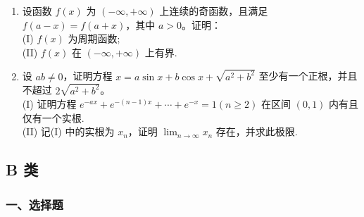 \documentclass[12pt, a4paper]{ctexart}
\begin{document}
\begin{enumerate}[start=52]
    \item 设函数 $ f(x) $ 为 $ (-\infty, +\infty) $ 上连续的奇函数，且满足 $ f(a - x) = f(a + x) $，其中 $ a > 0 $。证明：\\
    (I) $ f(x) $ 为周期函数;\\
    (II) $ f(x) $ 在 $ (-\infty, +\infty) $ 上有界.

    \item 设 $ ab \neq 0 $，证明方程 $ x = a \sin x + b \cos x + \sqrt{a^2 + b^2} $ 至少有一个正根，并且不超过 $ 2\sqrt{a^2 + b^2} $。\\
    (I) 证明方程 $ e^{-ax} + e^{-(n-1)x} + \cdots + e^{-x} = 1 (n \geq 2) $ 在区间 $ (0,1) $ 内有且仅有一个实根.\\
    (II) 记(I) 中的实根为 $ x_{n} $，证明 $ \lim_{n\to\infty}x_{n} $ 存在，并求此极限.
\end{enumerate}

\subsection{B 类}

\subsubsection*{一、选择题}
\end{document}
